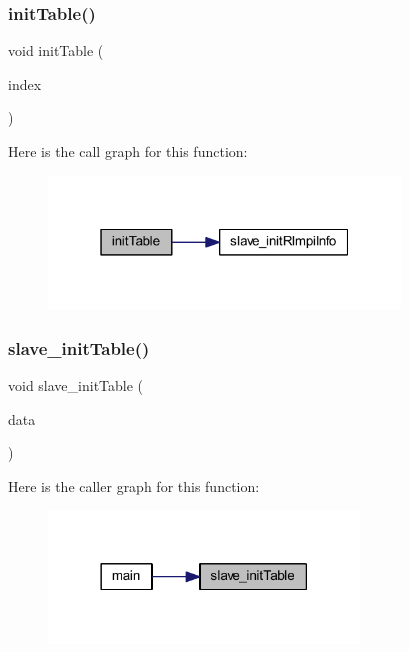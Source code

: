 \subsubsection{\texorpdfstring{initTable()}{initTable()}}
{\footnotesize\ttfamily void init\+Table (\begin{DoxyParamCaption}\item[{int}]{index }\end{DoxyParamCaption})}

Here is the call graph for this function\+:
\nopagebreak
\begin{figure}[H]
\begin{center}
\leavevmode
\includegraphics[width=265pt]{register_8C_a14fad51cfceca5a582218c98bdb3d769_cgraph}
\end{center}
\end{figure}
\mbox{\label{register_8C_aeb710bc88af64d82c952623c9082f060}} 
\subsubsection{\texorpdfstring{slave\_initTable()}{slave\_initTable()}}
{\footnotesize\ttfamily void slave\+\_\+init\+Table (\begin{DoxyParamCaption}\item[{\mbox{\hyperlink{structRlmpiInfo}{Rlmpi\+Info}} $\ast$}]{data }\end{DoxyParamCaption})}

Here is the caller graph for this function\+:
\nopagebreak
\begin{figure}[H]
\begin{center}
\leavevmode
\includegraphics[width=234pt]{register_8C_aeb710bc88af64d82c952623c9082f060_icgraph}
\end{center}
\end{figure}
